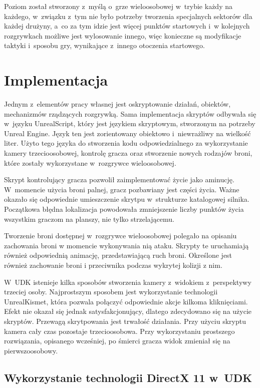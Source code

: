 Poziom został stworzony z~myślą o~grze wieloosobowej w~trybie każdy na każdego, w~związku z~tym nie było potrzeby tworzenia specjalnych sektorów dla każdej drużyny, a~co za tym idzie jest więcej punktów startowych i~w kolejnych rozgrywkach możliwe jest wylosowanie innego, więc konieczne są modyfikacje taktyki i~sposobu gry, wynikające z~innego otoczenia startowego.

\section{Implementacja}
Jednym z~elementów pracy własnej jest oskryptowanie działań, obiektów, mechanizmów rządzących rozgrywką. Sama implementacja skryptów odbywała się w~języku UnrealScript, który jest językiem skryptowym, stworzonym na potrzeby Unreal Engine. Język ten jest zorientowany obiektowo i~niewrażliwy na wielkość liter. Użyto tego języka do stworzenia kodu odpowiedzialnego za wykorzystanie kamery trzecioosobowej, kontrolę gracza oraz stworzenie nowych rodzajów broni, które zostały wykorzystane w~rozgrywce wieloosobowej.

Skrypt kontrolujący gracza pozwolił zaimplementować życie jako aminucję. W~momencie użycia broni palnej, gracz pozbawiany jest części życia. Ważne okazało się odpowiednie umieszczenie skrytpu w~strukturze katalogowej silnika. Początkowa błędna lokalizacja powodowała zmniejszenie liczby punktów życia wszystkim graczom na planszy, nie tylko strzelającemu.

Tworzenie broni dostępnej w~rozgrywce wieloosobowej polegało na opisaniu zachowania broni w momencie wykonywania nią ataku. Skrypty te uruchamiają również odpowiednią animację, przedstawiającą ruch broni. Określone jest również zachowanie broni i przeciwnika podczas wykrytej kolizji z nim. 

W~UDK istenieje kilka sposobów stworzenia kamery z~widokiem z~perspektywy trzeciej osoby. Najprostszym sposobem jest wykorzystanie technologii UnrealKismet, która pozwala połączyć odpowiednie akcje kilkoma kliknięciami. Efekt nie okazał się jednak satysfakcjonujący, dlatego zdecydowano się na użycie skryptów. %
Przewagą skrytpowania jest trwałość działania. Przy użyciu skryptu kamera cały czas pozostaje trzecioosobowa. Przy wykorzystaniu prostszego rozwiązania, opisanego wcześniej, po śmierci gracza widok zmieniał się na pierwszoosobowy. 

\subsection{Wykorzystanie technologii DirectX 11 w~UDK}

